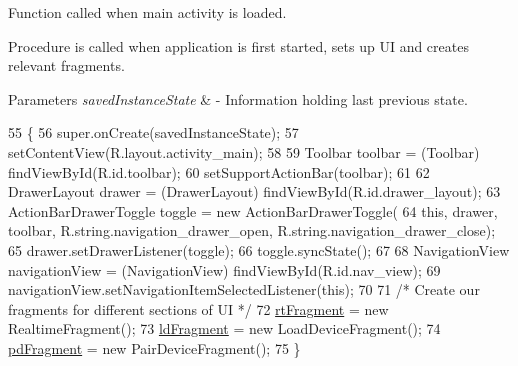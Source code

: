 Function called when main activity is loaded. 

Procedure is called when application is first started, sets up UI and creates relevant fragments.


\begin{DoxyParams}{Parameters}
{\em saved\+Instance\+State} & -\/ Information holding last previous state. \\
\hline
\end{DoxyParams}

\begin{DoxyCode}
55                                                        \{
56         super.onCreate(savedInstanceState);
57         setContentView(R.layout.activity\_main);
58 
59         Toolbar toolbar = (Toolbar) findViewById(R.id.toolbar);
60         setSupportActionBar(toolbar);
61 
62         DrawerLayout drawer = (DrawerLayout) findViewById(R.id.drawer\_layout);
63         ActionBarDrawerToggle toggle = \textcolor{keyword}{new} ActionBarDrawerToggle(
64                 \textcolor{keyword}{this}, drawer, toolbar, R.string.navigation\_drawer\_open, R.string.navigation\_drawer\_close);
65         drawer.setDrawerListener(toggle);
66         toggle.syncState();
67 
68         NavigationView navigationView = (NavigationView) findViewById(R.id.nav\_view);
69         navigationView.setNavigationItemSelectedListener(\textcolor{keyword}{this});
70 
71         \textcolor{comment}{/* Create our fragments for different sections of UI */}
72         \hyperlink{classcom_1_1jack_1_1motorbikestatistics_1_1_main_activity_a5d506143e7f082edf2078025c00f3715}{rtFragment} = \textcolor{keyword}{new} RealtimeFragment();
73         \hyperlink{classcom_1_1jack_1_1motorbikestatistics_1_1_main_activity_ac2ac0c852d3352efd6368ee550ef3c3c}{ldFragment} = \textcolor{keyword}{new} LoadDeviceFragment();
74         \hyperlink{classcom_1_1jack_1_1motorbikestatistics_1_1_main_activity_a2802ad16b5fdba42834d1b31e255dd96}{pdFragment} = \textcolor{keyword}{new} PairDeviceFragment();
75     \}
\end{DoxyCode}
\mbox{\label{classcom_1_1jack_1_1motorbikestatistics_1_1_main_activity_a38f3fc764869f436e53413ae14590872}} 
